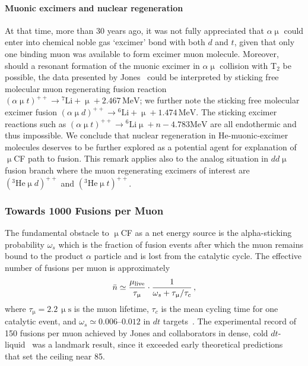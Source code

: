 \documentclass[particles,article,accept,pdftex,moreauthors]{Definitions/mdpi}
\begin{document}
\paragraph*{\bf Muonic excimers and nuclear regeneration}
At that time, more than 30 years ago, it was not fully appreciated that $\alpha\upmu$ could enter into chemical noble gas `excimer' bond with both $d$ and $t$, given that only one binding muon was available to form excimer muon molecule. Moreover, should a resonant formation of the muonic excimer in $\alpha\upmu$ collision with T$_2$ be possible, the data presented by Jones~\cite{jones1993evaluation,Jones1997} could be interpreted by sticking free molecular muon regenerating fusion reaction $(\alpha\upmu t)^{++}\to{}^7\mathrm{Li}+\upmu+2.467\,\mathrm{MeV}$; we further note the sticking free molecular excimer fusion $(\alpha\upmu d)^{++}\to{}^6\mathrm{Li}+\upmu+1.474\,\mathrm{MeV}$. The sticking excimer reactions such as $(\alpha\upmu t)^{++} \to{}^6\mathrm{Li}\upmu+n -4.783\mathrm{MeV}$ are all endothermic and thus impossible. We conclude that nuclear regeneration in He-muonic-excimer molecules deserves to be further explored as a potential agent for explanation of $\upmu$CF path to fusion. This remark applies also to the analog situation in $dd\upmu$ fusion branch where the muon regenerating excimers of interest are $({}^3\mathrm{He}\upmu d)^{++}$ and $({}^3\mathrm{He}\upmu t)^{++}$.

\subsubsection{Towards 1000 Fusions per Muon}\label{sssec:1000muCF}
The fundamental obstacle to $\upmu$CF as a net energy source is the alpha-sticking probability $\omega_s$ which is the fraction of fusion events after which the muon remains bound to the product $\alpha$ particle and is lost from the catalytic cycle. The effective number of fusions per muon is approximately
\begin{equation}
\bar{n} \simeq \frac{\mu_{\rm live}}{\tau_\upmu} \cdot \frac{1}{\omega_s + \tau_\upmu/\tau_c}\,,
\end{equation}
where $\tau_\upmu = 2.2\,\upmu\mathrm{s}$ is the muon lifetime, $\tau_c$ is the mean cycling time for one catalytic event, and $\omega_s \simeq 0.006$--$0.012$ in $dt$ targets~\cite{jones1993evaluation}. The experimental record of 150 fusions per muon achieved by Jones and collaborators in dense, cold $dt$-liquid~\cite{Jones:1983pw,Jones:1986kk,Jones:1986Na} was a landmark result, since it exceeded early theoretical predictions~\cite{Jackson:2010Rem} that set the ceiling near 85.
\end{document}
